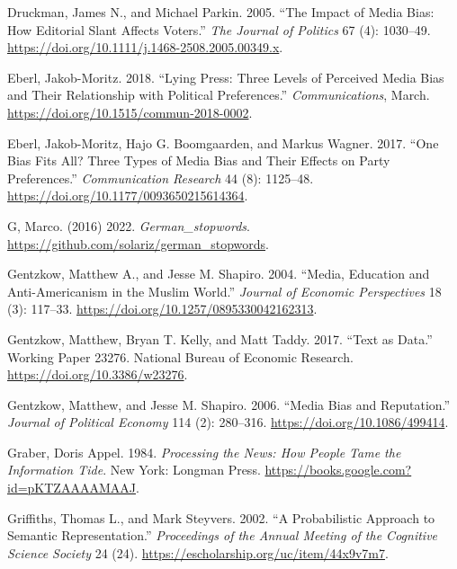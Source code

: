 \documentclass[
  12pt,
]{article}
\newlength{\cslhangindent}
\newlength{\cslentryspacingunit} %
\newenvironment{CSLReferences}[2] %
 {%
  \setlength{\parindent}{0pt}
  \ifodd #1
  \let\oldpar\par
  \def\par{\hangindent=\cslhangindent\oldpar}
  \fi
  \setlength{\parskip}{#2\cslentryspacingunit}
 }%
 {}
\begin{document}
\begin{CSLReferences}{1}{0}
\leavevmode{}%
Druckman, James N., and Michael Parkin. 2005. {``The {Impact} of {Media
Bias}: {How Editorial Slant Affects Voters}.''} \emph{The Journal of
Politics} 67 (4): 1030--49.
\url{https://doi.org/10.1111/j.1468-2508.2005.00349.x}.

\leavevmode{}%
Eberl, Jakob-Moritz. 2018. {``Lying Press: {Three} Levels of Perceived
Media Bias and Their Relationship with Political Preferences.''}
\emph{Communications}, March.
\url{https://doi.org/10.1515/commun-2018-0002}.

\leavevmode{}%
Eberl, Jakob-Moritz, Hajo G. Boomgaarden, and Markus Wagner. 2017.
{``One {Bias Fits All}? {Three Types} of {Media Bias} and {Their
Effects} on {Party Preferences}.''} \emph{Communication Research} 44
(8): 1125--48. \url{https://doi.org/10.1177/0093650215614364}.

\leavevmode{}%
G, Marco. (2016) 2022. \emph{German\_stopwords}.
\url{https://github.com/solariz/german_stopwords}.

\leavevmode{}%
Gentzkow, Matthew A., and Jesse M. Shapiro. 2004. {``Media, {Education}
and {Anti-Americanism} in the {Muslim World}.''} \emph{Journal of
Economic Perspectives} 18 (3): 117--33.
\url{https://doi.org/10.1257/0895330042162313}.

\leavevmode{}%
Gentzkow, Matthew, Bryan T. Kelly, and Matt Taddy. 2017. {``Text as
{Data}.''} Working Paper 23276. {National Bureau of Economic Research}.
\url{https://doi.org/10.3386/w23276}.

\leavevmode{}%
Gentzkow, Matthew, and Jesse M. Shapiro. 2006. {``Media {Bias} and
{Reputation}.''} \emph{Journal of Political Economy} 114 (2): 280--316.
\url{https://doi.org/10.1086/499414}.

\leavevmode{}%
Graber, Doris Appel. 1984. \emph{Processing the {News}: {How People
Tame} the {Information Tide}}. {New York}: {Longman Press}.
\url{https://books.google.com?id=pKTZAAAAMAAJ}.

\leavevmode{}%
Griffiths, Thomas L., and Mark Steyvers. 2002. {``A Probabilistic
Approach to Semantic Representation.''} \emph{Proceedings of the Annual
Meeting of the Cognitive Science Society} 24 (24).
\url{https://escholarship.org/uc/item/44x9v7m7}.


\end{CSLReferences}
\end{document}
